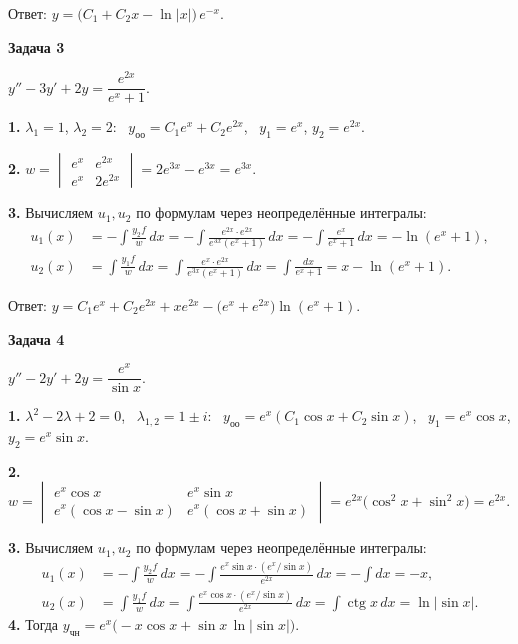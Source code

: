 \documentclass[11pt,a4paper]{article}
\newcommand{\example}[1]{\par\medskip\noindent\textbf{#1}\par\nopagebreak\smallskip}
\newcommand{\yoo}{y_{\text{оо}}}
\newcommand{\ych}{y_{\text{чн}}}
\newcommand{\ctgn}{\operatorname{ctg}}
\begin{document}
Ответ: $y = \bigl(C_1 + C_2 x - \ln|x|\bigr)\, e^{-x}$.

\example{Задача 3}

$y'' - 3y' + 2y = \dfrac{e^{2x}}{e^{x} + 1}$.

\textbf{1.} $\lambda_1 = 1$, $\lambda_2 = 2$: \ $\yoo = C_1 e^{x} + C_2 e^{2x}$, \ $y_1 = e^{x}$, $y_2 = e^{2x}$.

\textbf{2.} $w = \begin{vmatrix} e^{x} & e^{2x} \\ e^{x} & 2e^{2x} \end{vmatrix} = 2e^{3x} - e^{3x} = e^{3x}$.

\textbf{3.} Вычисляем $u_1,u_2$ по формулам через неопределённые интегралы:
\[
  \begin{aligned}
    u_1(x) &= -\int\frac{y_2f}{w}\,dx
      = -\int\frac{e^{2x}\cdot e^{2x}}{e^{3x}(e^x+1)}\,dx
      = -\int\frac{e^x}{e^x+1}\,dx = -\ln(e^x+1),\\
    u_2(x) &= \int\frac{y_1f}{w}\,dx
      = \int\frac{e^x\cdot e^{2x}}{e^{3x}(e^x+1)}\,dx
      = \int\frac{dx}{e^x+1} = x-\ln(e^x+1).
  \end{aligned}
\]

Ответ: $y = C_1 e^{x} + C_2 e^{2x} + x e^{2x} - \bigl(e^{x} + e^{2x}\bigr)\ln(e^{x} + 1)$.

\example{Задача 4}

$y'' - 2y' + 2y = \dfrac{e^{x}}{\sin x}$.

\textbf{1.} $\lambda^2 - 2\lambda + 2 = 0$, \ $\lambda_{1,2} = 1 \pm i$: \ $\yoo = e^{x}(C_1\cos x + C_2\sin x)$, \ $y_1 = e^{x}\cos x$, $y_2 = e^{x}\sin x$.

\textbf{2.} $w = \begin{vmatrix} e^{x}\cos x & e^{x}\sin x \\ e^{x}(\cos x - \sin x) & e^{x}(\cos x + \sin x) \end{vmatrix} = e^{2x}\bigl(\cos^2 x + \sin^2 x\bigr) = e^{2x}$.

\textbf{3.} Вычисляем $u_1,u_2$ по формулам через неопределённые интегралы:
\[
  \begin{aligned}
    u_1(x) &= -\int\frac{y_2f}{w}\,dx
      = -\int\frac{e^x\sin x\cdot(e^x/\sin x)}{e^{2x}}\,dx = -\int dx = -x,\\
    u_2(x) &= \int\frac{y_1f}{w}\,dx
      = \int\frac{e^x\cos x\cdot(e^x/\sin x)}{e^{2x}}\,dx
      = \int\ctgn x\,dx = \ln|\sin x|.
  \end{aligned}
\]
\textbf{4.} Тогда $\ych = e^x\bigl(-x\cos x + \sin x\,\ln|\sin x|\bigr)$.
\end{document}
